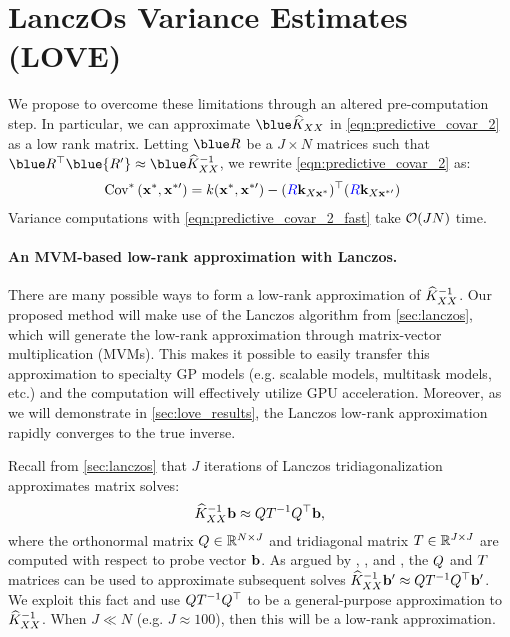 \section{LanczOs Variance Estimates (LOVE)}
\label{sec:love_method}



We propose to overcome these limitations through an altered pre-computation step.
In particular, we can approximate $\blue \trainK$ in \cref{eqn:predictive_covar_2} as a low rank matrix.
Letting $\blue \bR$ be a $J \times N$ matrices such that $\blue \bR^\top \blue{\bR'} \approx \blue \trainK^{-1}$, we rewrite \cref{eqn:predictive_covar_2} as:
%
\begin{align}
  \text{Cov}^* \left( \mathbf{x}^*, \mathbf{x}^{*\prime} \right)
  &= k(\mathbf{x}^*, \mathbf{x}^{*\prime}) - ({\color{blue} R} \mathbf{k}_{X\mathbf{x}^*})^\top ({\color{blue} R} \mathbf{k}_{X\mathbf{x}^{*\prime}})
  \label{eqn:predictive_covar_2_fast}
\end{align}
%
Variance computations with \cref{eqn:predictive_covar_2_fast} take $\bigo{JN}$ time.

\paragraph{An MVM-based low-rank approximation with Lanczos.}
There are many possible ways to form a low-rank approximation of $\widehat{K}_{XX}^{-1}$.
Our proposed method will make use of the Lanczos algorithm from \cref{sec:lanczos}, which will generate the low-rank approximation through matrix-vector multiplication (MVMs).
This makes it possible to easily transfer this approximation to specialty GP models (e.g. scalable models, multitask models, etc.) and the computation will effectively utilize GPU acceleration.
Moreover, as we will demonstrate in \cref{sec:love_results}, the Lanczos low-rank approximation rapidly converges to the true inverse.

Recall from \cref{sec:lanczos} that $J$ iterations of Lanczos tridiagonalization approximates matrix solves:
\[
  \widehat{K}_{XX}^{-1} \mathbf{b} \approx Q T^{-1} Q^{\top} \mathbf{b},
\]
where the orthonormal matrix $Q \in \mathbb{R}^{N \times J}$ and tridiagonal matrix $T \in \mathbb{R}^{J \times J}$ are computed with respect to probe vector $\mathbf{b}$.
As argued by \citet{parlett1980new}, \citet{saad1987lanczos}, and \citet{schneider2001krylov}, the $Q$ and $T$ matrices can be used to approximate subsequent solves
$\widehat{K}_{XX}^{-1} \mathbf{b}' \approx Q T^{-1} Q^\top \mathbf{b}'$.
We exploit this fact and use $Q T^{-1} Q^\top$ to be a general-purpose approximation to $\widehat{K}_{XX}^{-1}$.
When $J \ll N$ (e.g. $J \approx 100$), then this will be a low-rank approximation.

